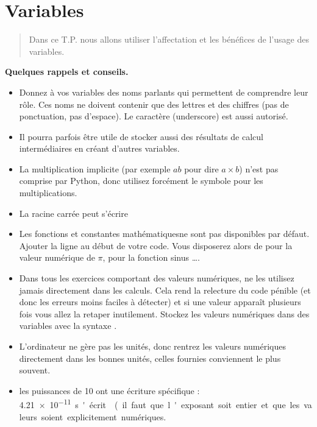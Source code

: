 \chapter{Variables}
\thispagestyle{empty}
\begin{abstract} Dans ce T.P. nous allons utiliser l'affectation et les bénéfices de l'usage des variables.
\end{abstract}

\bigskip


{\bf Quelques rappels et conseils.}
\begin{itemize}
    \item Donnez à vos variables des noms parlants qui permettent de comprendre leur rôle. Ces noms ne doivent contenir que des lettres et des chiffres (pas de ponctuation, pas d'espace). Le caractère \type{\_} (underscore) est aussi autorisé.
    \item Il pourra parfois être utile de stocker aussi des résultats de calcul intermédiaires en créant d'autres variables.
    \item La multiplication implicite (par exemple $ab$ pour dire $a\times b$) n'est pas comprise par Python, donc utilisez forcément le symbole \type{*} pour les multiplications.
    \item La racine  carrée peut s'écrire 
    \item Les fonctions et constantes mathématiquesne sont pas disponibles par défaut. Ajouter la ligne  au début de votre code. Vous disposerez alors de  pour la valeur numérique de $\pi$,  pour la fonction sinus \dots.
    \item Dans tous les exercices comportant des valeurs numériques, ne les utilisez jamais directement dans les calculs. Cela rend la relecture du code pénible (et donc les erreurs moins faciles à détecter) et si une valeur apparaît plusieurs fois vous allez la retaper inutilement. Stockez les valeurs numériques dans des variables avec la syntaxe .
    \item L'ordinateur ne gère pas les unités, donc rentrez les valeurs numériques directement dans les bonnes unités,  celles fournies conviennent le plus souvent.
    \item les puissances de 10 ont une écriture spécifique : \SI{4.21e-11} s'écrit  (il faut que l'exposant soit entier et que les valeurs soient explicitement numériques.
\end{itemize}
